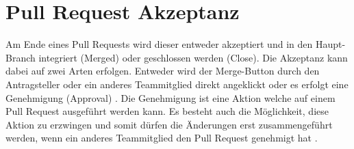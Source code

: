 \section{Pull Request Akzeptanz}
Am Ende eines Pull Requests wird dieser entweder akzeptiert und in den Haupt-Branch integriert (Merged) oder geschlossen werden (Close)\parencite{noauthor_merging_nodate}\parencite{noauthor_closing_nodate}. Die Akzeptanz kann dabei auf zwei Arten erfolgen. Entweder wird der Merge-Button durch den Antragsteller oder ein anderes Teammitglied direkt angeklickt oder es erfolgt eine Genehmigung (Approval) \parencite{noauthor_merging_nodate}\parencite{noauthor_reviewing_nodate}. Die Genehmigung ist eine Aktion welche auf einem Pull Request ausgeführt werden kann. Es besteht auch die Möglichkeit, diese Aktion zu erzwingen und somit dürfen die Änderungen erst zusammengeführt werden, wenn ein anderes Teammitglied den Pull Request genehmigt hat \parencite{noauthor_approving_nodate}.


